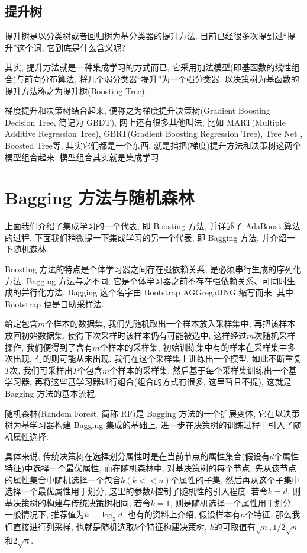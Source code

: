 \documentclass[a4paper,UTF8]{ctexart}
\theoremstyle{plain} \newtheorem{theorem}{定理}[section]
\theoremstyle{plain} \newtheorem{definition}{定义}[section]
\theoremstyle{plain} \newtheorem{lemma}{引理}[section]
\theoremstyle{plain} \newtheorem{proposition}{命题}[section]
\theoremstyle{plain} \newtheorem{example}{例}[section]
\theoremstyle{plain} \newtheorem{remark}{注}[section]
\theoremstyle{plain} \newtheorem{corollary}{推论}[section]
\begin{document}
\subsection{提升树}
提升树是以分类树或者回归树为基分类器的提升方法. 目前已经很多次提到过“提升”这个词, 它到底是什么含义呢?

其实, 提升方法就是一种集成学习的方式而已, 它采用加法模型(即基函数的线性组合)与前向分布算法, 将几个弱分类器“提升”为一个强分类器. 以决策树为基函数的提升方法称之为提升树(Boosting Tree). 

梯度提升和决策树结合起来, 便称之为梯度提升决策树(Gradient Boosting Decision Tree, 简记为 GBDT), 网上还有很多其他叫法, 比如 MART(Multiple Additive Regression Tree), GBRT(Gradient Boosting Regression Tree), Tree Net , Boosted Tree等, 其实它们都是一个东西, 就是指把(梯度)提升方法和决策树这两个模型组合起来, 模型组合其实就是集成学习.




\section{Bagging 方法与随机森林}
上面我们介绍了集成学习的一个代表, 即 Boosting 方法, 并详述了 AdaBoost 算法的过程. 下面我们稍微提一下集成学习的另一个代表, 即 Bagging 方法, 并介绍一下随机森林.

Boosting 方法的特点是个体学习器之间存在强依赖关系, 是必须串行生成的序列化方法. Bagging 方法与之不同, 它是个体学习器之前不存在强依赖关系、可同时生成的并行化方法. Bagging 这个名字由 Bootstrap AGGregatING 缩写而来. 其中 Bootstrap 便是自助采样法.

给定包含$m$个样本的数据集, 我们先随机取出一个样本放入采样集中, 再把该样本放回初始数据集, 使得下次采样时该样本仍有可能被选中, 这样经过$m$次随机采样操作, 我们便得到了含有$m$个样本的采样集, 初始训练集中有的样本在采样集中多次出现, 有的则可能从未出现. 我们在这个采样集上训练出一个模型. 如此不断重复$T$次, 我们可采样出$T$个包含$m$个样本的采样集, 然后基于每个采样集训练出一个基学习器, 再将这些基学习器进行组合(组合的方式有很多, 这里暂且不提), 这就是 Bagging 方法的基本流程.

随机森林(Random Forest, 简称 RF)是 Bagging 方法的一个扩展变体, 它在以决策树为基学习器构建 Bagging 集成的基础上, 进一步在决策树的训练过程中引入了随机属性选择. 

具体来说, 传统决策树在选择划分属性时是在当前节点的属性集合(假设有$d$个属性特征)中选择一个最优属性, 而在随机森林中, 对基决策树的每个节点, 先从该节点的属性集合中随机选择一个包含$k(k << n)$个属性的子集, 然后再从这个子集中选择一个最优属性用于划分, 这里的参数$k$控制了随机性的引入程度: 若令$k = d$, 则基决策树的构建与传统决策树相同; 若令$k = 1$, 则是随机选择一个属性用于划分. 一般情况下, 推荐值为$k = \log_{2} d$. 也有的资料上介绍, 假设样本有$n$个特征, 那么我们直接进行列采样, 也就是随机选取$k$个特征构建决策树, $k$的可取值有$\sqrt{n}, 1 / 2 \sqrt{n}$和$2 \sqrt{n}$.
\end{document}

